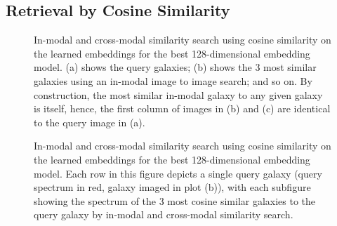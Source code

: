 \subsection{Retrieval by Cosine Similarity}\label{subsec:results-retrieval}
\begin{figure}[t]
    \centering
    \caption{In-modal and cross-modal similarity search using cosine similarity on the learned embeddings for the
        best 128-dimensional embedding model.
        (a) shows the query galaxies; (b) shows the 3 most similar galaxies using an in-modal image to image search; and
        so on.
        By construction, the most similar in-modal galaxy to any given galaxy is itself, hence, the first column of images
        in (b) and (c) are identical to the query image in (a).}
    \label{fig:ssia}
\end{figure}

\begin{figure}[t]
    \centering
    \caption{In-modal and cross-modal similarity search using cosine similarity on the learned embeddings for the
        best 128-dimensional embedding model.
        Each row in this figure depicts a single query galaxy (query spectrum in red, galaxy imaged in plot (b)), with
        each subfigure showing the spectrum of the 3 most cosine similar galaxies to the
        query galaxy by in-modal and cross-modal similarity search.}
    \label{fig:sss}
\end{figure}

